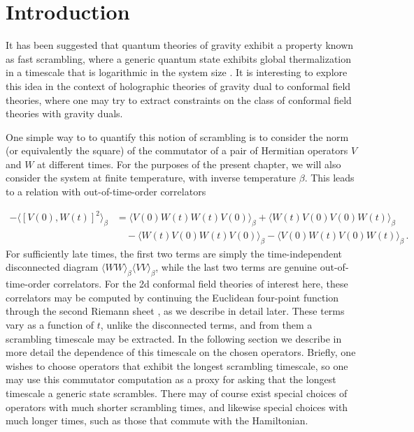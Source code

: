 \documentclass{brownthesis}
\begin{document}
\section{Introduction}

It has been suggested that quantum theories of gravity exhibit a property
known as fast scrambling, where a generic quantum state exhibits global
thermalization in a timescale that is logarithmic in the system size
\cite{Sekino:2008he}. It is interesting to explore this idea in
the context of holographic theories of gravity dual to conformal field
theories, where one may try to extract constraints on the class of
conformal field theories with gravity duals.

One simple way to to quantify this notion of scrambling is to consider
the norm (or equivalently the square) of the commutator of a pair
of Hermitian operators $V$ and $W$ at different times. For the purposes
of the present chapter, we will also consider the system at finite temperature,
with inverse temperature $\beta$. This leads to a relation with out-of-time-order
correlators

\begin{align}
-\langle[V(0),W(t)]^{2}\rangle_{\beta} & =\langle V(0)W(t)W(t)V(0)\rangle_{\beta}+\langle W(t)V(0)V(0)W(t)\rangle_{\beta}\nonumber \\
 & \quad-\langle W(t)V(0)W(t)V(0)\rangle_{\beta}-\langle V(0)W(t)V(0)W(t)\rangle_{\beta}\,.\label{eq:commutator}
\end{align}
For sufficiently late times, the first two terms are simply the time-independent
disconnected diagram $\langle WW\rangle_{\beta}\langle VV\rangle_{\beta}$,
while the last two terms are genuine out-of-time-order correlators.
For the 2d conformal field theories of interest here, these correlators
may be computed by continuing the Euclidean four-point function through
the second Riemann sheet \cite{PhysRevLett.115.131603}, as we describe
in detail later. These terms vary as a function of $t$, unlike the
disconnected terms, and from them a scrambling timescale may be extracted.
In the following section we describe in more detail the dependence
of this timescale on the chosen operators. Briefly, one wishes to
choose operators that exhibit the longest scrambling timescale, so
one may use this commutator computation as a proxy for asking that
the longest timescale a generic state scrambles. There may of course
exist special choices of operators with much shorter scrambling times,
and likewise special choices with much longer times, such as those
that commute with the Hamiltonian.
\end{document}
